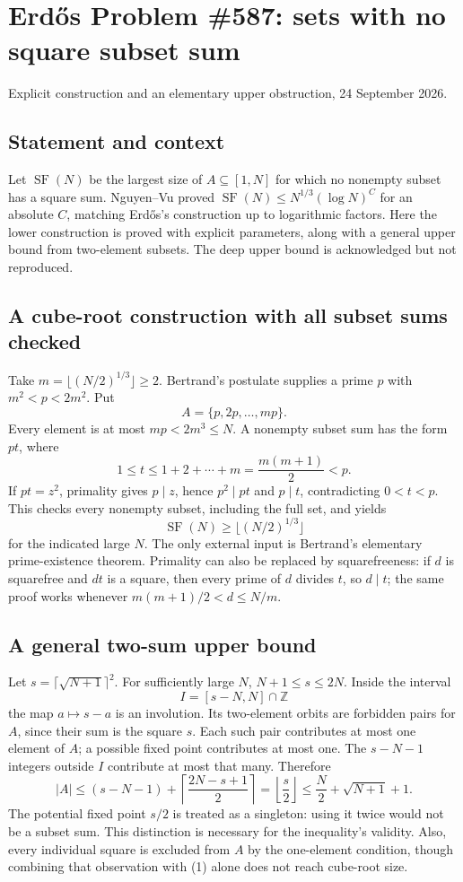 \section{Erd\H{o}s Problem \#587: sets with no square subset sum}
\noindent Explicit construction and an elementary upper obstruction, 24 September 2026.

\subsection*{Statement and context}
Let $\operatorname{SF}(N)$ be the largest size of $A\subseteq[1,N]$ for which no nonempty subset has a square sum. Nguyen--Vu proved $\operatorname{SF}(N)\leq N^{1/3}(\log N)^C$ for an absolute $C$, matching Erd\H{o}s's construction up to logarithmic factors. Here the lower construction is proved with explicit parameters, along with a general upper bound from two-element subsets. The deep upper bound is acknowledged but not reproduced.

\subsection*{A cube-root construction with all subset sums checked}
Take $m=\lfloor(N/2)^{1/3}\rfloor\geq2$. Bertrand's postulate supplies a prime $p$ with $m^2<p<2m^2$. Put
\[A=\{p,2p,\ldots,mp\}.\]
Every element is at most $mp<2m^3\leq N$. A nonempty subset sum has the form $pt$, where
\[1\leq t\leq1+2+\cdots+m=\frac{m(m+1)}2<p.
\]
If $pt=z^2$, primality gives $p\mid z$, hence $p^2\mid pt$ and $p\mid t$, contradicting $0<t<p$. This checks every nonempty subset, including the full set, and yields
\[\operatorname{SF}(N)\geq\lfloor(N/2)^{1/3}\rfloor
\]
for the indicated large $N$. The only external input is Bertrand's elementary prime-existence theorem. Primality can also be replaced by squarefreeness: if $d$ is squarefree and $dt$ is a square, then every prime of $d$ divides $t$, so $d\mid t$; the same proof works whenever $m(m+1)/2<d\leq N/m$.

\subsection*{A general two-sum upper bound}
Let $s=\lceil\sqrt{N+1}\rceil^2$. For sufficiently large $N$, $N+1\leq s\leq2N$. Inside the interval
\[I=[s-N,N]\cap\mathbb Z
\]
the map $a\mapsto s-a$ is an involution. Its two-element orbits are forbidden pairs for $A$, since their sum is the square $s$. Each such pair contributes at most one element of $A$; a possible fixed point contributes at most one. The $s-N-1$ integers outside $I$ contribute at most that many. Therefore
\[
|A|\leq(s-N-1)+\left\lceil\frac{2N-s+1}{2}\right\rceil
=\left\lfloor\frac s2\right\rfloor
\leq\frac N2+\sqrt{N+1}+1.\tag{1}
\]
The potential fixed point $s/2$ is treated as a singleton: using it twice would not be a subset sum. This distinction is necessary for the inequality's validity. Also, every individual square is excluded from $A$ by the one-element condition, though combining that observation with (1) alone does not reach cube-root size.

